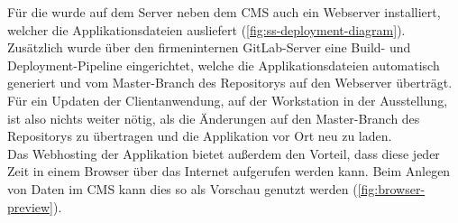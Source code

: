 Für die \shst{} wurde auf dem Server neben dem CMS auch ein Webserver installiert, welcher die 
Applikationsdateien ausliefert (\autoref{fig:ss-deployment-diagram}). Zusätzlich wurde über den 
firmeninternen GitLab-Server \cite{gitlab} eine Build- und Deployment-Pipeline eingerichtet, welche die 
Applikationsdateien automatisch generiert und vom Master-Branch des Repositorys auf den Webserver überträgt. 
Für ein Updaten der Clientanwendung, auf der Workstation in der Ausstellung, ist also nichts weiter 
nötig, als die Änderungen auf den Master-Branch des Repositorys zu übertragen und die Applikation vor
Ort neu zu laden.\\
Das Webhosting der Applikation bietet außerdem den Vorteil, dass diese jeder Zeit in einem Browser 
über das Internet aufgerufen werden kann. Beim Anlegen von Daten im CMS kann dies so als
Vorschau genutzt werden (\autoref{fig:browser-preview}). 